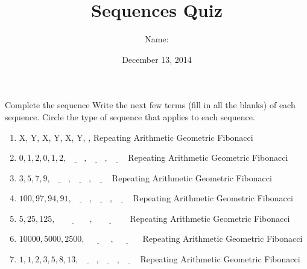 \documentclass[12pt,letterpaper]{article}
\title{Sequences Quiz}
\author{Name: \underline{\hspace{5cm}}}
\date{December 13, 2014}
\makeatletter
\newenvironment{problem}{\@startsection
       {section}
       {1}
       {-.2em}
       {-3.5ex plus -1ex minus -.2ex}
       {2.3ex plus .2ex}
       {\pagebreak[3]
       \large\bf\noindent{Problem }
       }
       }
\makeatother
\begin{document}
\maketitle

\thispagestyle{empty}

\begin{problem}{Complete the sequence}
 Write the next few terms (fill in all the blanks) of each sequence. Circle the type of sequence
 that applies to each sequence.
 
 \begin{enumerate}
  \item X, Y, X, Y, X, Y, \underline{\hspace{2em}}, \underline{\hspace{2em}}
  \hfill Repeating Arithmetic Geometric Fibonacci
  \item $0, 1, 2, 0, 1, 2, \underline{\hspace{2em}}, \underline{\hspace{2em}}, \underline{\hspace{2em}}$
  \hfill Repeating Arithmetic Geometric Fibonacci
  \item $3, 5, 7, 9, \underline{\hspace{2em}}, \underline{\hspace{2em}}, \underline{\hspace{2em}}$
  \hfill Repeating Arithmetic Geometric Fibonacci
  \item $100, 97, 94, 91, \underline{\hspace{2em}}, \underline{\hspace{2em}}, \underline{\hspace{2em}}$
  \hfill Repeating Arithmetic Geometric Fibonacci
  \item $5, 25, 125, \underline{\hspace{4em}}, \underline{\hspace{4em}}$
  \hfill Repeating Arithmetic Geometric Fibonacci
  \item $10000, 5000, 2500, \underline{\hspace{3em}}, \underline{\hspace{3em}}$
  \hfill Repeating Arithmetic Geometric Fibonacci
  \item $1, 1, 2, 3, 5, 8, 13, \underline{\hspace{2em}}, \underline{\hspace{2em}}, \underline{\hspace{2em}}$
  \hfill Repeating Arithmetic Geometric Fibonacci
 \end{enumerate}
\end{problem}
\end{document}
